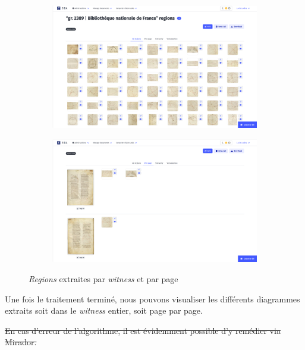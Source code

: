 \begin{figure}[h]
	\centering
	\begin{subfigure}{0.48\linewidth}
		\centering
		\includegraphics[width=\linewidth]{images/regions_par_witness.png}
	\end{subfigure}
	\hfill
	\begin{subfigure}{0.48\linewidth}
		\centering
		\includegraphics[width=\linewidth]{images/regions_par_page.png}
	\end{subfigure}
	\caption{\textit{Regions} extraites par \textit{witness} et par page}
	\label{fig:regions_extraction}
\end{figure}


Une fois le traitement terminé, nous pouvons visualiser les différents diagrammes extraits soit dans le \textit{witness} entier, soit page par page.

\st{En cas d'erreur de l'algorithme, il est évidemment possible d'y remédier via Mirador.}


